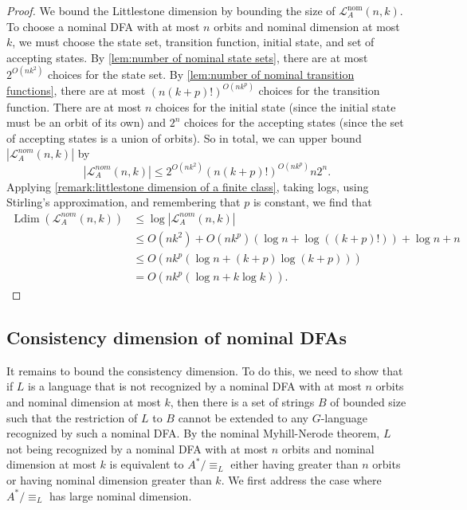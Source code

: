 \documentclass[11pt,a4paper]{amsart}
\theoremstyle{definition}
\newcommand{\mc}{\mathcal}
\DeclareMathOperator{\Ldim}{Ldim}
\begin{document}
\begin{proof}
    We bound the Littlestone dimension by bounding the size of $\mc L^{\text{nom}}_A(n,k)$. 
    To choose a nominal DFA with at most $n$ orbits and nominal dimension at most $k$, we must choose the state set, transition function, initial state, and set of accepting states. 
    By \autoref{lem:number of nominal state sets}, there are at most $2^{O(nk^2)}$ choices for the state set. 
    By \autoref{lem:number of nominal transition functions}, there are at most $\left(n (k+p)!\right)^{O(nk^{p})}$ choices for the transition function.
    There are at most $n$ choices for the initial state (since the initial state must be an orbit of its own) and $2^n$ choices for the accepting states (since the set of accepting states is a union of orbits).
    So in total, we can upper bound $|\mc L^{nom}_A(n,k)|$ by 
    \[
        |\mc L^{nom}_A(n,k)| \leq 2^{O\left(nk^2\right)} \left(n (k+p)!\right)^{O\left(nk^{p}\right)} n 2^n.
    \]
    Applying \autoref{remark:littlestone dimension of a finite class}, taking logs, using Stirling's approximation, and remembering that $p$ is constant, we find that 
    \begin{align*}
        \Ldim(\mc L^{nom}_A(n,k)) &\leq \log |\mc L^{nom}_A(n,k)| \\
        &\leq O\left(nk^2\right) + O\left(nk^{p}\right)(\log n + \log((k+p)!)) + \log n + n \\
        &\leq O\left(nk^{p} \left(\log n + (k+p)\log(k+p) \right)\right) \\
        &= O\left(nk^{p} \left(\log n + k \log k \right)\right).
    \end{align*}
\end{proof}


\subsection{Consistency dimension of nominal DFAs}

It remains to bound the consistency dimension.
To do this, we need to show that if $L$ is a language that is not recognized by a nominal DFA with at most $n$ orbits and nominal dimension at most $k$, then there is a set of strings $B$ of bounded size such that the restriction of $L$ to $B$ cannot be extended to any $G$-language recognized by such a nominal DFA. 
By the nominal Myhill-Nerode theorem, $L$ not being recognized by a nominal DFA with at most $n$ orbits and nominal dimension at most $k$ is equivalent to $A^* / \equiv_L$ either having greater than $n$ orbits or having nominal dimension greater than $k$.
We first address the case where $A^* / \equiv_L$ has large nominal dimension.
\end{document}
